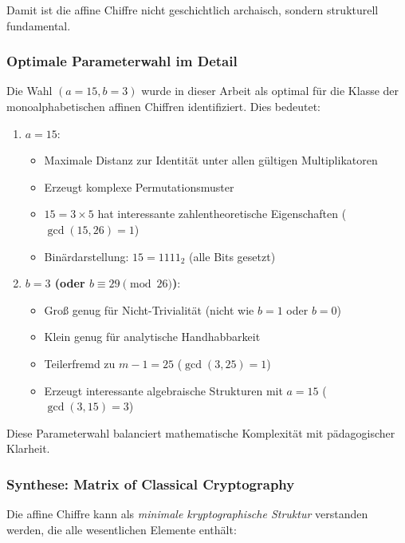 ﻿\documentclass[12pt,a4paper]{article}
\begin{document}
	Damit ist die affine Chiffre nicht geschichtlich archaisch, sondern strukturell fundamental.
	
	\subsubsection{Optimale Parameterwahl im Detail}
	
	Die Wahl $(a=15, b=3)$ wurde in dieser Arbeit als optimal für die Klasse der monoalphabetischen affinen Chiffren identifiziert. Dies bedeutet:
	
	\begin{enumerate}
		\item \textbf{$a = 15$}: 
		\begin{itemize}
			\item Maximale Distanz zur Identität unter allen gültigen Multiplikatoren
			\item Erzeugt komplexe Permutationsmuster
			\item $15 = 3 \times 5$ hat interessante zahlentheoretische Eigenschaften ($\gcd(15, 26) = 1$)
			\item Binärdarstellung: $15 = 1111_2$ (alle Bits gesetzt)
		\end{itemize}
		
		\item \textbf{$b = 3$ (oder $b \equiv 29 \pmod{26}$)}:
		\begin{itemize}
			\item Groß genug für Nicht-Trivialität (nicht wie $b = 1$ oder $b = 0$)
			\item Klein genug für analytische Handhabbarkeit
			\item Teilerfremd zu $m - 1 = 25$ ($\gcd(3, 25) = 1$)
			\item Erzeugt interessante algebraische Strukturen mit $a = 15$ ($\gcd(3, 15) = 3$)
		\end{itemize}
	\end{enumerate}
	
	Diese Parameterwahl balanciert mathematische Komplexität mit pädagogischer Klarheit.
	
	\subsubsection{Synthese: Matrix of Classical Cryptography}
	
	Die affine Chiffre kann als \textit{minimale kryptographische Struktur} verstanden werden, die alle wesentlichen Elemente enthält:
	
\end{document}
